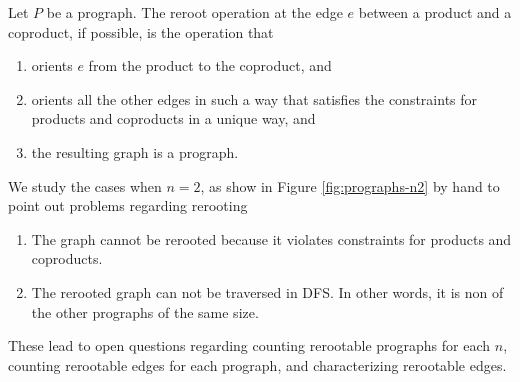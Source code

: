 \begin{definition}
  Let $P$ be a prograph. The reroot operation at the edge $e$ between a product and a coproduct, if possible, is the operation that
  \begin{enumerate}
    \item orients $e$ from the product to the coproduct, and
    \item orients all the other edges in such a way that satisfies the constraints for products and coproducts in a unique way, and
    \item the resulting graph is a prograph.
  \end{enumerate}
\end{definition}

We study the cases when $n=2$, as show in Figure \ref{fig:prographs-n2} by hand to point out problems regarding rerooting

\begin{enumerate}
  \item The graph cannot be rerooted because it violates constraints for products and coproducts.
  \item The rerooted graph can not be traversed in DFS. In other words, it is non of the other prographs of the same size.
\end{enumerate}

These lead to open questions regarding counting rerootable prographs for each $n$, counting rerootable edges for each prograph, and characterizing rerootable edges.

